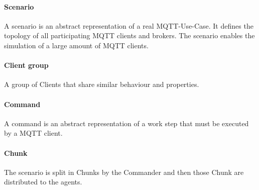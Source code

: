 \paragraph{Scenario}
A scenario is an abstract representation of a real MQTT-Use-Case.
It defines the topology of all participating MQTT clients and brokers.
The scenario enables the simulation of a large amount of MQTT clients.

\paragraph{Client group}
A group of Clients that share similar behaviour and properties.

\paragraph{Command}
A command is an abstract representation of a work step that must be executed by a MQTT client.

\paragraph{Chunk}
The scenario is split in Chunks by the Commander and then those Chunk are distributed to the agents.





